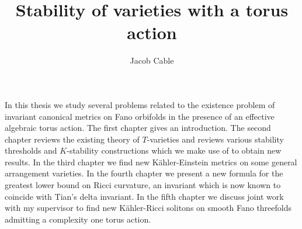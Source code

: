 



\title{Stability of varieties with a torus action}
\author{Jacob Cable}
\def\wordcount{: lots}


\beforeabstract

In this thesis we study several problems related to the existence problem of invariant canonical metrics on Fano orbifolds in the presence of an effective algebraic torus action. The first chapter gives an introduction. The second chapter reviews the existing theory of \(T\)-varieties and reviews various stability thresholds and \(K\)-stability constructions which we make use of to obtain new results. In the third chapter we find new K\"ahler-Einstein metrics on some general arrangement varieties. In the fourth chapter we present a new formula for the greatest lower bound on Ricci curvature, an invariant which is now known to coincide with Tian's delta invariant. In the fifth chapter we discuss joint work with my supervisor to find new K\"ahler-Ricci solitons on smooth Fano threefolds admitting a complexity one torus action. 

\afterabstract



\afterpreface












\appendix


 

